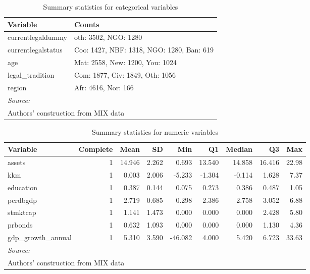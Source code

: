 \documentclass[a4paper, nobind]{templates/ociamthesis}
\begin{document}
\begin{table}

\caption{\label{tab:unnamed-chunk-32}Summary statistics for categorical variables}
\centering
\begin{tabular}[t]{ll}
\toprule
Variable & Counts\\
\midrule
currentlegaldummy & oth: 3502, NGO: 1280\\
currentlegalstatus & Coo: 1427, NBF: 1318, NGO: 1280, Ban: 619\\
age & Mat: 2558, New: 1200, You: 1024\\
legal\_tradition & Com: 1877, Civ: 1849, Oth: 1056\\
region & Afr: 4616, Nor: 166\\
\bottomrule
\multicolumn{2}{l}{\rule{0pt}{1em}\textit{Source: }}\\
\multicolumn{2}{l}{\rule{0pt}{1em}Authors' construction from MIX data}\\
\end{tabular}
\end{table}

\begin{table}

\caption{\label{tab:unnamed-chunk-33}Summary statistics for numeric variables}
\centering
\begin{tabular}[t]{lrrrrrrrr}
\toprule
Variable & Complete & Mean & SD & Min & Q1 & Median & Q3 & Max\\
\midrule
assets & 1 & 14.946 & 2.262 & 0.693 & 13.540 & 14.858 & 16.416 & 22.98\\
kkm & 1 & 0.003 & 2.006 & -5.233 & -1.304 & -0.114 & 1.628 & 7.37\\
education & 1 & 0.387 & 0.144 & 0.075 & 0.273 & 0.386 & 0.487 & 1.05\\
pcrdbgdp & 1 & 2.719 & 0.685 & 0.298 & 2.386 & 2.758 & 3.052 & 6.88\\
stmktcap & 1 & 1.141 & 1.473 & 0.000 & 0.000 & 0.000 & 2.428 & 5.80\\
\addlinespace
prbonds & 1 & 0.632 & 1.093 & 0.000 & 0.000 & 0.000 & 1.130 & 4.36\\
gdp\_growth\_annual & 1 & 5.310 & 3.590 & -46.082 & 4.000 & 5.420 & 6.723 & 33.63\\
\bottomrule
\multicolumn{9}{l}{\rule{0pt}{1em}\textit{Source: }}\\
\multicolumn{9}{l}{\rule{0pt}{1em}Authors' construction from MIX data}\\
\end{tabular}
\end{table}
\end{document}
